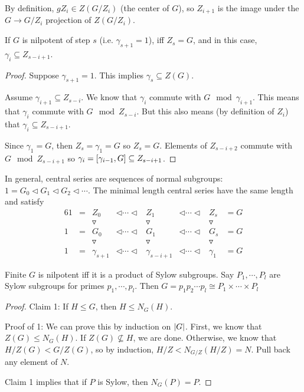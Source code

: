 \documentclass[a4paper,twoside,master.tex]{subfiles}
\begin{document}
By definition, $ g Z_i \in Z(G/Z_i) $ (the center of $ G $), so $ Z_{i+1} $ is the image under the $ G \to G/Z_i $ projection of $ Z(G/Z_i) $.


\begin{claim}
    If $ G $ is nilpotent of step $ s $ (i.e. $ \gamma_{s+1} = 1 $), iff $ Z_s = G $, and in this case, $ \gamma_i \subseteq Z_{s-i+1} $.
\end{claim}

\begin{proof}
    Suppose $ \gamma_{s+1} = 1 $. This implies $ \gamma_s \subseteq Z(G) $.

    Assume $ \gamma_{i+1} \subseteq Z_{s-i} $. We know that $ \gamma_i $ commute with $ G\mod\gamma_{i+1} $. This means that $ \gamma_i $ commute with $ G\mod Z_{s-i} $. But this also means (by definition of $ Z_i $) that $ \gamma_i \subseteq Z_{s-i+1} $.

    Since $ \gamma_1 = G $, then $ Z_s = \gamma_1 = G $ so $ Z_s = G $. Elements of $ Z_{s-i+2} $ commute with $ G\mod Z_{s-i+1} $ so $ \gamma_i = \comm{\gamma_{i-1}}{G} \subseteq Z_{s-i+1} $. 
\end{proof}

In general, central series are sequences of normal subgroups: $ 1 = G_0 \triangleleft G_1 \triangleleft G_2 \triangleleft \cdots $. The minimal length central series have the same length and satisfy
\begin{alignat}{6}
    1 &= &Z_0 &\triangleleft \cdots \triangleleft &Z_1 &\triangleleft \cdots\triangleleft &Z_s &= G\\
    & & \triangledown & &\triangledown & &\triangledown & \\ 
    1 &= &G_0 &\triangleleft \cdots \triangleleft &G_1 &\triangleleft \cdots\triangleleft &G_s &= G\\
    & & \triangledown & &\triangledown & &\triangledown & \\ 
    1 &= &\gamma_{s+1} &\triangleleft \cdots \triangleleft &\gamma_{s-i+1} &\triangleleft \cdots\triangleleft &\gamma_1 &= G
\end{alignat}

\begin{theorem}
    Finite $ G $ is nilpotent iff it is a product of Sylow subgroups. Say $ P_1, \cdots, P_l $ are Sylow subgroups for primes $ p_1, \cdots, p_l $. Then $ G = p_1 p_2 \cdots p_l \cong P_1 \times \cdots \times P_l $
\end{theorem}

\begin{proof}
    Claim 1: If $ H \leq G $, then $ H \leq N_G(H) $.

    Proof of 1: We can prove this by induction on $ \abs{G} $. First, we know that $ Z(G) \leq N_G(H) $. If $ Z(G) \nsubseteq H $, we are done. Otherwise, we know that $ H/Z(G) < G/Z(G) $, so by induction, $ H/Z < N_{G/Z}(H/Z) = N $. Pull back any element of $ N $.

    Claim 1 implies that if $ P $ is Sylow, then $ N_G(P) = P $.
\end{proof}
\end{document}

